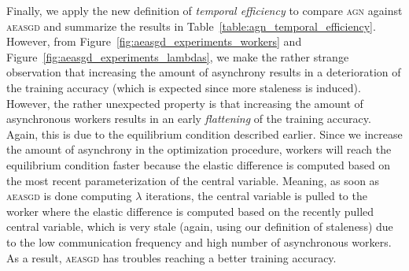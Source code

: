 Finally, we apply the new definition of \emph{temporal efficiency} to compare \textsc{agn} against \textsc{aeasgd} and summarize the results in Table~\ref{table:agn_temporal_efficiency}. However, from Figure~\ref{fig:aeasgd_experiments_workers} and Figure~\ref{fig:aeasgd_experiments_lambdas}, we make the rather strange observation that increasing the amount of asynchrony results in a deterioration of the training accuracy (which is expected since more staleness is induced). However, the rather unexpected property is that increasing the amount of asynchronous workers results in an early \emph{flattening} of the training accuracy. Again, this is due to the equilibrium condition described earlier. Since we increase the amount of asynchrony in the optimization procedure, workers will reach the equilibrium condition faster because the elastic difference is computed based on the most recent parameterization of the central variable. Meaning, as soon as \textsc{aeasgd} is done computing $\lambda$ iterations, the central variable is pulled to the worker where the elastic difference is computed based on the recently pulled central variable, which is very stale (again, using our definition of staleness) due to the low communication frequency and high number of asynchronous workers. As a result, \textsc{aeasgd} has troubles reaching a better training accuracy.

